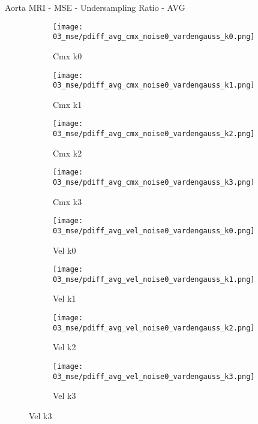 \documentclass{beamer}
\begin{document}
\begin{frame}{Aorta MRI - MSE - Undersampling Ratio - AVG}{}
\begin{figure}
\begin{subfigure}{0.24\textwidth}
\texttt{[image: 03\_mse/pdiff\_avg\_cmx\_noise0\_vardengauss\_k0.png]}
\vspace{-20pt}
\caption*{\tiny Cmx k0}
\end{subfigure}
\begin{subfigure}{0.24\textwidth}
\texttt{[image: 03\_mse/pdiff\_avg\_cmx\_noise0\_vardengauss\_k1.png]}
\vspace{-20pt}
\caption*{\tiny Cmx k1}
\end{subfigure}
\begin{subfigure}{0.24\textwidth}
\texttt{[image: 03\_mse/pdiff\_avg\_cmx\_noise0\_vardengauss\_k2.png]}
\vspace{-20pt}
\caption*{\tiny Cmx k2}
\end{subfigure}
\begin{subfigure}{0.24\textwidth}
\texttt{[image: 03\_mse/pdiff\_avg\_cmx\_noise0\_vardengauss\_k3.png]}
\vspace{-20pt}
\caption*{\tiny Cmx k3}
\end{subfigure}

\begin{subfigure}{0.24\textwidth}
\texttt{[image: 03\_mse/pdiff\_avg\_vel\_noise0\_vardengauss\_k0.png]}
\vspace{-20pt}
\caption*{\tiny Vel k0}
\end{subfigure}
\begin{subfigure}{0.24\textwidth}
\texttt{[image: 03\_mse/pdiff\_avg\_vel\_noise0\_vardengauss\_k1.png]}
\vspace{-20pt}
\caption*{\tiny Vel k1}
\end{subfigure}
\begin{subfigure}{0.24\textwidth}
\texttt{[image: 03\_mse/pdiff\_avg\_vel\_noise0\_vardengauss\_k2.png]}
\vspace{-20pt}
\caption*{\tiny Vel k2}
\end{subfigure}
\begin{subfigure}{0.24\textwidth}
\texttt{[image: 03\_mse/pdiff\_avg\_vel\_noise0\_vardengauss\_k3.png]}
\vspace{-20pt}
\caption*{\tiny Vel k3}
\end{subfigure}
\end{figure}
\end{frame}
\end{document}

